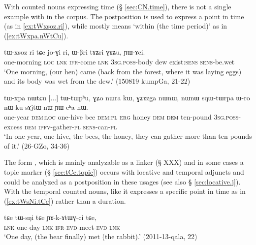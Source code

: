 With counted nouns expressing time (§ \ref{sec:CN.time}), there is not a single example with  in the corpus. The postposition  is used to express a point in time  (as in \ref{ex:tWxsoz.ri}), while  mostly means `within (the time period)' as in (\ref{ex:tWxpa.nWtCu}).  

\begin{exe}
\ex \label{ex:tWxsoz.ri}
\gll tɯ-xsoz ri tɕe jo-ɣi ri, ɯ-βri tɤʑri ɣɤʑu, ɲɯ-ɤci. \\
one-morning \textsc{loc} \textsc{lnk} \textsc{ifr}-come \textsc{lnk} \textsc{3sg}.\textsc{poss}-body dew exist:\textsc{sens} \textsc{sens}-be.wet \\
\glt `One morning, (our hen) came (back from the forest, where it was laying eggs) and its body was wet from the dew.' (150819 kumpGa, 21-22)
\end{exe}

\begin{exe}
\ex \label{ex:tWxpa.nWtCu}
\gll  tɯ-xpa nɯtɕu [...] tɯ-tɯpʰu, ɣʑo nɯra kɯ, ɣʑɤzga nɯnɯ, nɯnɯ sqɯ-tɯrpa ɯ-ro nɯ ku-sɤjtɯ-nɯ ɲɯ-cʰa-nɯ. \\
one-year \textsc{dem}:\textsc{loc} { } one-hive bee \textsc{dem}:\textsc{pl} \textsc{erg} honey \textsc{dem} \textsc{dem} ten-pound \textsc{3sg}.\textsc{poss}-excess \textsc{dem} \textsc{ipfv}-gather-\textsc{pl} \textsc{sens}-can-\textsc{pl} \\
\glt  `In one year, one hive, the bees, the honey, they can gather more than ten pounds of it.' (26-GZo, 34-36)
\end{exe}

The form , which  is mainly analyzable as a linker (§ XXX) and in some cases a topic marker (§ \ref{sec:tCe.topic}) occurs with locative and temporal adjuncts and could be analyzed as a postposition in these usages (see also § \ref{sec:locative.j}). With the temporal counted nouns, like  it expresses a specific point in time as in (\ref{ex:tWsNi.tCe}) rather than a duration.

 \begin{exe}
\ex \label{ex:tWsNi.tCe}
\gll   tɕe tɯ-sŋi tɕe ɲɤ-k-ɤtɯɣ-ci tɕe, \\
\textsc{lnk} one-day \textsc{lnk} \textsc{ifr}-\textsc{evd}-meet-\textsc{evd} \textsc{lnk} \\
\glt  `One day, (the bear finally) met (the rabbit).' (2011-13-qala, 22)
\end{exe}


